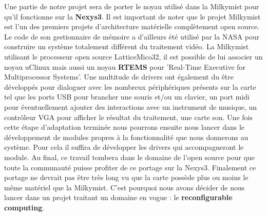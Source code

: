 \medskip
Une partie de notre projet sera de porter le noyau utilisé dans la Milkymist pour qu'il fonctionne sur la {\bf Nexys3}. Il est important de noter que le projet Milkymist est l'un des premiers projets d'architecture matérielle complètement open source. Le code de son gestionnaire de mémoire a d'ailleurs été utilisé par la NASA pour construire un système totalement différent du traitement vidéo.
\medskip
La Milkymist utilisant le processeur open source LatticeMico32, il est possible de lui associer un noyau uClinux mais aussi un noyau {\bf RTEMS} pour 'Real-Time Executive for Multiprocessor Systems'. Une multitude de drivers ont également du être développés pour dialoguer avec les nombreux périphériques présents sur la carte tel que les ports USB pour brancher une souris et/ou un clavier, un port midi pour éventuellement ajouter des interactions avec un instrument de musique, un contrôleur VGA pour afficher le résultat du traitement, une carte son.
\medskip
Une fois cette étape d'adaptation terminée nous pourrons ensuite nous lancer dans le développement de modules propres à la fonctionnalité que nous donnerons au système. Pour cela il suffira de développer les drivers qui accompagneront le module. Au final, ce travail tombera dans le domaine de l'open source pour que toute la communauté puisse profiter de ce portage sur la Nexys3.
\medskip
Finalement ce portage ne devrait pas être très long vu que la carte possède plus ou moins le même matériel que la Milkymist. C'est pourquoi nous avons décider de nous lancer dans un projet traitant un domaine en vogue : le {\bf reconfigurable computing}.
\medskip